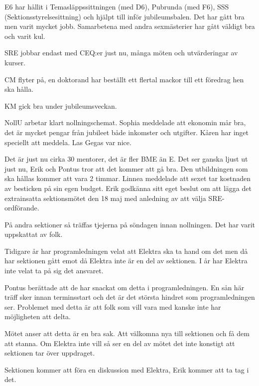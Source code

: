 \documentclass[10pt]{article}
\begin{document}
\begin{paragrafer}
\begin{paragrafer}
E6 har hållit i Temasläppssittningen (med D6), Pubrunda (med F6), SSS (Sektionsstyrelsesittning) och hjälpt till inför jubileumsbalen. Det har gått bra men varit mycket jobb. Samarbetena med andra sexmästerier har gått väldigt bra och varit kul.

SRE jobbar endast med CEQ:er just nu, många möten och utvärderingar av kurser.

CM flyter på, en doktorand har beställt ett flertal mackor till ett föredrag hen ska hålla.

KM gick bra under jubileumsveckan.

NollU arbetar klart nollningschemat.
Sophia meddelade att ekonomin mår bra, det är mycket pengar från jubileet både inkomster och utgifter.
Kåren har inget speciellt att meddela. Las Gegas var nice.
\end{paragrafer}
\newpage
{}
Det är just nu cirka 30 mentorer, det är fler BME än E. Det ser ganska ljust ut just nu, Erik och Pontus tror att det kommer att gå bra. Den utbildningen som ska hållas kommer att vara 2 timmar.
Linnea meddelade att sexet tar kostnaden av besticken på sin egen budget.
Erik \ypa godkänna sitt eget beslut om att lägga det extrainsatta sektionsmötet den 18 maj med anledning av att välja SRE-ordförande.

\Mbaby

På andra sektioner så träffas tjejerna på söndagen innan nollningen. Det har varit uppskattat av folk.

Tidigare år har programledningen velat att Elektra ska ta hand om det men då har sektionen gått emot då Elektra inte är en del av sektionen. I år har Elektra inte velat ta på sig det ansvaret.

Pontus berättade att de har snackat om detta i programledningen. En sån här träff sker innan terminsstart och det är det största hindret som programledningen ser. Problemet med detta är att folk som vill vara med kanske inte har möjligheten att delta.

Mötet anser att detta är en bra sak. Att välkomna nya till sektionen och få dem att stanna. Om Elektra inte vill så ser en del av mötet det inte konstigt att sektionen tar över uppdraget.

Sektionen kommer att föra en diskussion med Elektra, Erik kommer att ta tag i det.


\end{paragrafer}
\end{document}
